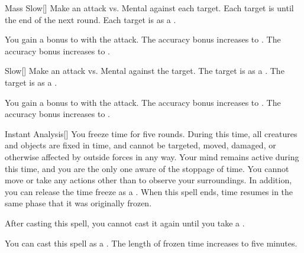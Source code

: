 \lowercase{\hypertarget{spell:Mass Slow}{}}\label{spell:Mass Slow}
\begin{freeability}[Rank 1]{\hypertarget{spell:Mass Slow}{Mass Slow}}[]
Make an attack vs. Mental against each target.
\hit Each target is  until the end of the next round.
\crit Each target is  as a .

\rankline
{} You gain a  bonus to  with the attack.
 The accuracy bonus increases to .
 The accuracy bonus increases to .
\end{freeability}
\vspace{0.25em}



\lowercase{\hypertarget{spell:Slow}{}}\label{spell:Slow}
\begin{freeability}[Rank 1]{\hypertarget{spell:Slow}{Slow}}[]
Make an attack vs. Mental against the target.
\hit The target is  as a .
\crit The target is  as a .

\rankline
{} You gain a  bonus to  with the attack.
 The accuracy bonus increases to .
 The accuracy bonus increases to .
\end{freeability}
\vspace{0.25em}



\lowercase{\hypertarget{spell:Instant Analysis}{}}\label{spell:Instant Analysis}
\begin{freeability}[Rank 3]{\hypertarget{spell:Instant Analysis}{Instant Analysis}}[]
You freeze time for five rounds.
During this time, all creatures and objects are fixed in time, and cannot be targeted, moved, damaged, or otherwise affected by outside forces in any way.
Your mind remains active during this time, and you are the only one aware of the stoppage of time.
You cannot move or take any actions other than to observe your surroundings.
In addition, you can release the time freeze as a .
When this spell ends, time resumes in the same phase that it was originally frozen.

After casting this spell, you cannot cast it again until you take a .

\rankline
{} You can cast this spell as a .
 The length of frozen time increases to five minutes.
\end{freeability}
\vspace{0.25em}



